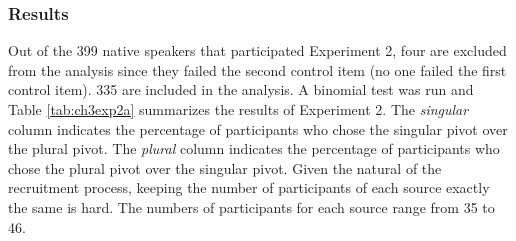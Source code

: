 \documentclass[
  11pt          %
  ,letterpaper  %
  ,center       %
  ,noupper      %
  ]{uconnthesis2}
\begin{document}
\subsubsection{Results}

Out of the 399 native speakers that participated Experiment 2, four are excluded from the analysis since they failed the second control item (no one failed the first control item). 335 are included in the analysis. A binomial test was run and Table \ref{tab:ch3exp2a} summarizes the results of Experiment 2. The \textit{singular} column indicates the percentage of participants who chose the singular pivot over the plural pivot. The \textit{plural} column indicates the percentage of participants who chose the plural pivot over the singular pivot. Given the natural of the recruitment process, keeping the number of participants of each source exactly the same is hard. The numbers of participants for each source range from 35 to 46.
\end{document}
